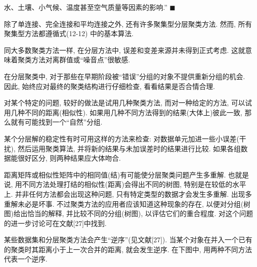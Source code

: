 
水、土壤、小气候、温度甚至空气质量等因素的影响.” \hfill$\blacksquare$


除了单连接、完全连接和平均连接之外, 还有许多聚集型分层聚类方法. 然而, 所有聚集型方法都遵循式(12-12) 中的基本算法.

同大多数聚类方法一样, 在分层方法中, 误差和变差来源并未得到正式考虑. 这就意味着聚类方法对离群值或“噪音点”很敏感.

在分层聚类中, 对于那些在早期阶段被“错误”分组的对象不提供重新分组的机会. 因此, 始终应对最终的聚类结构进行仔细检查, 看看结果是否合情合理.

对某个特定的问题, 较好的做法是试用几种聚类方法, 而对一种给定的方法, 可以试用几种不同的距离(相似性).
如果用几种不同方法得到的结果(大体上)彼此一致, 那么就有可能找到一个“自然”分组.

某个分层解的稳定性有时可用这样的方法来检查: 对数据单元加进一些小误差(干扰), 然后运用聚类算法, 并将新的结果与未加误差时的结果进行比较.
如果各组数据能很好区分, 则两种结果应大体吻合.

距离矩阵或相似性矩阵中的相同值(结)有可能使分层聚类问题产生多重解. 也就是说, 用不同方法处理打结的相似性(距离)会得出不同的树图, 特别是在较低的水平上.
并非任何方法都会出现这种问题, 只有特定类型的数据才会发生多重解. 出现多重解未必是坏事.
不过聚类方法的应用者应该知道这种现象的存在, 以便对分组(树图)给出恰当的解释, 并比较不同的分组(树图), 以评估它们的重合程度.
对这个问题的进一步讨论可在文献[27]中找到.

某些数据集和分层聚类方法会产生“逆序”(见文献[27]).
当某个对象在并入一个已有的聚类时其距离小于上一次合并的距离, 就会发生逆序. 在下图中, 用两种不同方法代表一个逆序.

